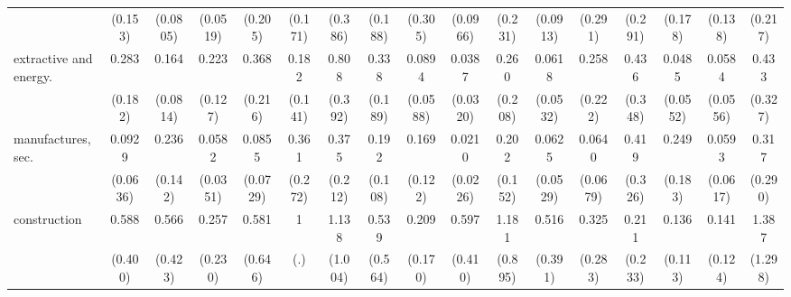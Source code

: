 {\begin{tabular}{l*{16}{c}}
                    &     (0.153)         &    (0.0805)         &    (0.0519)         &     (0.205)         &     (0.171)         &     (0.386)         &     (0.188)         &     (0.305)         &    (0.0966)         &     (0.231)         &    (0.0913)         &     (0.291)         &     (0.291)         &     (0.178)         &     (0.138)         &     (0.217)         \\
[1em]
extractive and energy.&       0.283\sym{*}  &       0.164\sym{***}&       0.223\sym{**} &       0.368         &       0.182\sym{*}  &       0.808         &       0.338         &      0.0894\sym{***}&      0.0387\sym{***}&       0.260         &      0.0618\sym{**} &       0.258         &       0.436         &      0.0485\sym{**} &      0.0584\sym{**} &       0.433         \\
                    &     (0.182)         &    (0.0814)         &     (0.127)         &     (0.216)         &     (0.141)         &     (0.392)         &     (0.189)         &    (0.0588)         &    (0.0320)         &     (0.208)         &    (0.0532)         &     (0.222)         &     (0.348)         &    (0.0552)         &    (0.0556)         &     (0.327)         \\
[1em]
manufactures, sec.  &      0.0929\sym{***}&       0.236\sym{*}  &      0.0582\sym{***}&      0.0855\sym{**} &       0.361         &       0.375         &       0.192\sym{**} &       0.169\sym{*}  &      0.0210\sym{***}&       0.202\sym{*}  &      0.0625\sym{**} &      0.0640\sym{**} &       0.419         &       0.249         &      0.0593\sym{**} &       0.317         \\
                    &    (0.0636)         &     (0.142)         &    (0.0351)         &    (0.0729)         &     (0.272)         &     (0.212)         &     (0.108)         &     (0.122)         &    (0.0226)         &     (0.152)         &    (0.0529)         &    (0.0679)         &     (0.326)         &     (0.183)         &    (0.0617)         &     (0.290)         \\
[1em]
construction        &       0.588         &       0.566         &       0.257         &       0.581         &           1         &       1.138         &       0.539         &       0.209         &       0.597         &       1.181         &       0.516         &       0.325         &       0.211         &       0.136\sym{*}  &       0.141\sym{*}  &       1.387         \\
                    &     (0.400)         &     (0.423)         &     (0.230)         &     (0.646)         &         (.)         &     (1.004)         &     (0.564)         &     (0.170)         &     (0.410)         &     (0.895)         &     (0.391)         &     (0.283)         &     (0.233)         &     (0.113)         &     (0.124)         &     (1.298)         \\

\end{tabular}}
